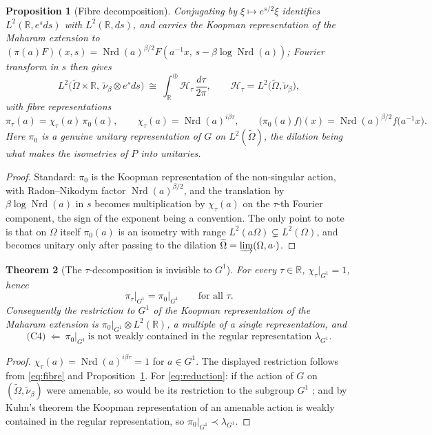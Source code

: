 \documentclass[11pt]{amsart}
\numberwithin{equation}{section}
\newtheorem{theorem}{Theorem}[section]
\newtheorem{proposition}[theorem]{Proposition}
\theoremstyle{definition}
\theoremstyle{remark}
\newcommand{\R}{\mathbb{R}}
\newcommand{\Nrd}{\operatorname{Nrd}}
\begin{document}
\begin{proposition}[Fibre decomposition]\label{prop:fibres}
Conjugating by $\xi\mapsto e^{s/2}\xi$ identifies $L^2(\R,e^{s}ds)$ with $L^2(\R,ds)$, and
carries the Koopman representation of the Maharam extension to
$(\pi(a)F)(x,s)=\Nrd(a)^{\beta/2}F(a^{-1}x,\,s-\beta\log\Nrd(a))$; Fourier transform in $s$ then
gives
\[
L^2\bigl(\widetilde\Omega\times\R,\ \tilde\nu_\beta\otimes e^{s}ds\bigr)
\ \cong\ \int_\R^\oplus\mathcal H_\tau\,\frac{d\tau}{2\pi},
\qquad
\mathcal H_\tau=L^2\bigl(\widetilde\Omega,\tilde\nu_\beta\bigr),
\]
with fibre representations
\begin{equation}\label{eq:fibre}
\pi_\tau(a)=\chi_\tau(a)\,\pi_0(a),
\qquad
\chi_\tau(a)=\Nrd(a)^{i\beta\tau},
\qquad
\bigl(\pi_0(a)f\bigr)(x)=\Nrd(a)^{\beta/2}f\bigl(a^{-1}x\bigr).
\end{equation}
Here $\pi_0$ is a genuine unitary representation of $G$ on $L^2(\widetilde\Omega)$, the
dilation being what makes the isometries of $P$ into unitaries.
\end{proposition}

\begin{proof}
Standard: $\pi_0$ is the Koopman representation of the non-singular action, with
Radon--Nikodym factor $\Nrd(a)^{\beta/2}$, and the translation by $\beta\log\Nrd(a)$ in $s$
becomes multiplication by $\chi_\tau(a)$ on the $\tau$-th Fourier component, the sign of the
exponent being a convention. The only point to note is that on $\Omega$ itself $\pi_0(a)$ is
an isometry with range $L^2(a\Omega)\subsetneq L^2(\Omega)$, and becomes unitary only after
passing to the dilation $\widetilde\Omega=\varinjlim(\Omega,a\cdot)$.
\end{proof}

\begin{theorem}[The $\tau$-decomposition is invisible to $G^1$]\label{thm:invisible}
For every $\tau\in\R$, $\chi_\tau|_{G^1}=1$, hence
\[
\pi_\tau\big|_{G^1}=\pi_0\big|_{G^1}\qquad\text{for all }\tau .
\]
Consequently the restriction to $G^1$ of the Koopman representation of the Maharam extension
is $\pi_0|_{G^1}\otimes L^2(\R)$, a multiple of a single representation, and
\begin{equation}\label{eq:reduction}
\text{(C4)}\ \Longleftarrow\ \pi_0\big|_{G^1}\ \text{is not weakly contained in the regular representation }\lambda_{G^1}.
\end{equation}
\end{theorem}

\begin{proof}
$\chi_\tau(a)=\Nrd(a)^{i\beta\tau}=1$ for $a\in G^1$. The displayed restriction follows from
\eqref{eq:fibre} and Proposition~\ref{prop:fibres}. For \eqref{eq:reduction}: if the
action of $G$ on $(\widetilde\Omega,\tilde\nu_\beta)$ were amenable, so would be its
restriction to the subgroup $G^1$ \cite{AD}; and by Kuhn's theorem \cite{Kuhn}
the Koopman representation of an amenable action is weakly contained in the regular
representation, so $\pi_0|_{G^1}\prec\lambda_{G^1}$.
\end{proof}
\end{document}
